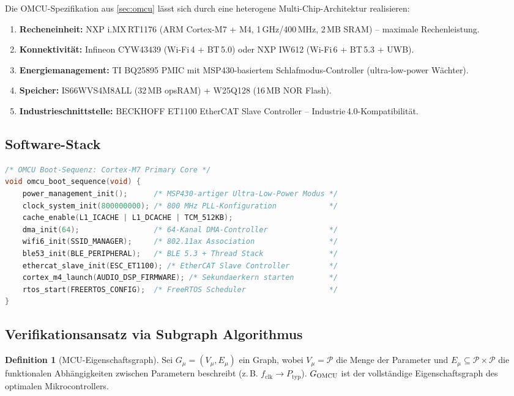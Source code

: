 ﻿\documentclass[12pt, a4paper]{article}
\theoremstyle{plain}
\theoremstyle{definition}
\newtheorem{definition}[theorem]{Definition}
\theoremstyle{remark}
\newcommand{\omcu}{\textsc{OMCU}}
\begin{document}
Die \omcu{}-Spezifikation aus \cref{sec:omcu} lässt sich durch eine
heterogene Multi-Chip-Architektur realisieren:

\begin{enumerate}[label=\textbf{(\Alph*)}]
  \item \textbf{Recheneinheit:} NXP i.MX\,RT1176 (ARM Cortex-M7 + M4,
        1\,GHz/400\,MHz, 2\,MB SRAM) -- maximale Rechenleistung.
  \item \textbf{Konnektivität:} Infineon CYW43439 (Wi-Fi\,4 + BT\,5.0) oder
        NXP IW612 (Wi-Fi\,6 + BT\,5.3 + UWB).
  \item \textbf{Energiemanagement:} TI BQ25895 PMIC mit MSP430-basiertem
        Schlafmodus-Controller (ultra-low-power Wächter).
  \item \textbf{Speicher:} IS66WVS4M8ALL (32\,MB opsRAM) +
        W25Q128 (16\,MB NOR Flash).
  \item \textbf{Industrieschnittstelle:} BECKHOFF ET1100 EtherCAT Slave
        Controller -- Industrie\,4.0-Kompatibilität.
\end{enumerate}

\subsection{Software-Stack}

\begin{lstlisting}[language=C, caption={OMCU Boot-Sequenz (konzeptionell)}]
/* OMCU Boot-Sequenz: Cortex-M7 Primary Core */
void omcu_boot_sequence(void) {
    power_management_init();      /* MSP430-artiger Ultra-Low-Power Modus */
    clock_system_init(800000000); /* 800 MHz PLL-Konfiguration            */
    cache_enable(L1_ICACHE | L1_DCACHE | TCM_512KB);
    dma_init(64);                 /* 64-Kanal DMA-Controller              */
    wifi6_init(SSID_MANAGER);     /* 802.11ax Association                 */
    ble53_init(BLE_PERIPHERAL);   /* BLE 5.3 + Thread Stack               */
    ethercat_slave_init(ESC_ET1100); /* EtherCAT Slave Controller         */
    cortex_m4_launch(AUDIO_DSP_FIRMWARE); /* Sekundaerkern starten        */
    rtos_start(FREERTOS_CONFIG);  /* FreeRTOS Scheduler                   */
}
\end{lstlisting}

\subsection{Verifikationsansatz via Subgraph Algorithmus}

\begin{definition}[MCU-Eigenschaftsgraph]
\label{def:eigenschaftsgraph}
  Sei $G_\mu = (V_\mu, E_\mu)$ ein Graph, wobei
  $V_\mu = \mathcal{P}$ die Menge der Parameter und
  $E_\mu \subseteq \mathcal{P} \times \mathcal{P}$ die
  funktionalen Abhängigkeiten zwischen Parametern beschreibt
  (z.\,B. $f_\text{clk} \to P_\text{typ}$).
  $G_{\omcu{}}$ ist der vollständige Eigenschaftsgraph des optimalen
  Mikrocontrollers.
\end{definition}
\end{document}
